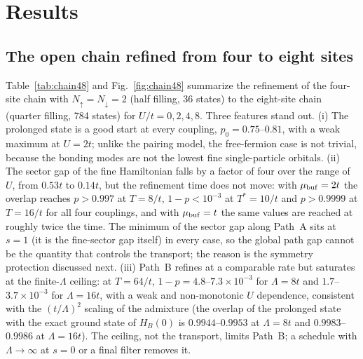 \documentclass[
  aps,
  prc,
  reprint,
  superscriptaddress,
  floatfix,
  nofootinbib
]{revtex4-2}
\begin{document}
\section{Results}
\label{sec:results}

\subsection{The open chain refined from four to eight sites}
\label{sec:chain48}
Table~\ref{tab:chain48} and Fig.~\ref{fig:chain48} summarize the refinement
of the four-site chain with $N_\uparrow=N_\downarrow=2$ (half filling, 36
states) to the eight-site chain (quarter filling, 784 states) for
$U/t=0,2,4,8$.  Three features stand out.  (i) The prolonged state is a good
start at every coupling, $p_0=0.75$--$0.81$, with a weak maximum at $U=2t$;
unlike the pairing model, the free-fermion case is not trivial, because the
bonding modes are not the lowest fine single-particle orbitals.  (ii) The
sector gap of the fine Hamiltonian falls by a factor of four over the range
of $U$, from $0.53t$ to $0.14t$, but the refinement time does not move: with
$\mu_{\rm buf}=2t$ the overlap reaches $p>0.997$ at $T=8/t$,
$1-p<10^{-3}$ at $T^*=10/t$ and $p>0.9999$ at $T=16/t$ for all four
couplings, and with $\mu_{\rm buf}=t$ the same values are reached at roughly
twice the time.  The minimum of the sector gap along Path~A sits at $s=1$
(it is the fine-sector gap itself) in every case, so the global path gap
cannot be the quantity that controls the transport; the reason is the symmetry
protection discussed next.  (iii) Path~B refines at a comparable rate but
saturates at the finite-$\Lambda$ ceiling: at $T=64/t$,
$1-p=4.8$--$7.3\times10^{-3}$ for $\Lambda=8t$ and $1.7$--$3.7\times10^{-3}$
for $\Lambda=16t$, with a weak and non-monotonic $U$ dependence, consistent
with the $(t/\Lambda)^2$ scaling of the admixture (the overlap of the
prolonged state with the exact ground state of $H_B(0)$ is $0.9944$--$0.9953$
at $\Lambda=8t$ and $0.9983$--$0.9986$ at $\Lambda=16t$).  The ceiling, not
the transport, limits Path~B; a schedule with $\Lambda\to\infty$ at $s=0$ or
a final filter removes it.
\end{document}
